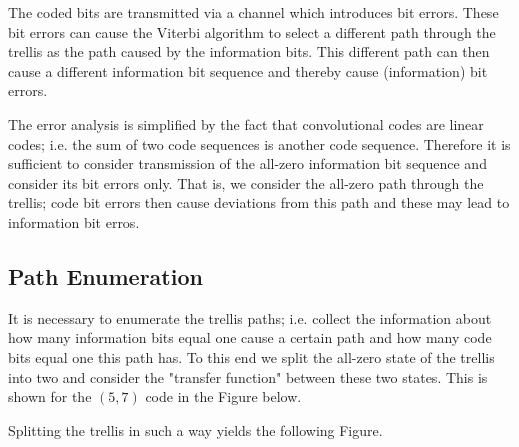 
The coded bits are transmitted via a channel which introduces bit errors. These bit errors can cause the Viterbi algorithm to select a different path through the trellis as the path caused by the information bits. This different path can then cause a different information bit sequence and thereby cause (information) bit errors.

The error analysis is simplified by the fact that convolutional codes are linear codes; i.e. the sum of two code sequences is another code sequence. Therefore it is sufficient to consider transmission of the all-zero information bit sequence and consider its bit errors only. That is, we consider the all-zero path through the trellis; code bit errors then cause deviations from this path and these may lead to information bit erros.

\subsection{Path Enumeration}

It is necessary to enumerate the trellis paths; i.e. collect the information about how many information bits equal one cause a certain path and how many code bits equal one this path has. To this end we split the all-zero state of the trellis into two and consider the "transfer function" between these two states. This is shown for the $(5,7)$ code in the Figure below.

Splitting the trellis in such a way yields the following Figure.

\vspace*{7mm}


